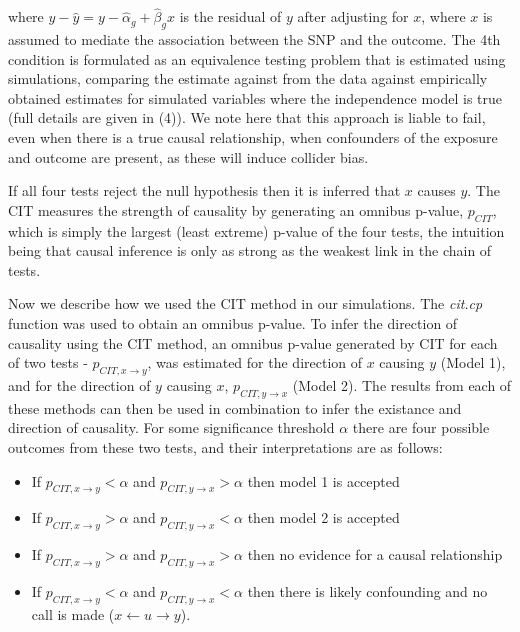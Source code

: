 \documentclass[]{article}
\providecommand{\tightlist}{%
  \setlength{\itemsep}{0pt}\setlength{\parskip}{0pt}}
\begin{document}
where \(y - \hat{y} = y - \hat{\alpha}_g + \hat{\beta}_g x\) is the
residual of \(y\) after adjusting for \(x\), where \(x\) is assumed to
mediate the association between the SNP and the outcome. The 4th
condition is formulated as an equivalence testing problem that is
estimated using simulations, comparing the estimate against from the
data against empirically obtained estimates for simulated variables
where the independence model is true (full details are given in (4)). We
note here that this approach is liable to fail, even when there is a
true causal relationship, when confounders of the exposure and outcome
are present, as these will induce collider bias.

If all four tests reject the null hypothesis then it is inferred that
\(x\) causes \(y\). The CIT measures the strength of causality by
generating an omnibus p-value, \(p_{CIT}\), which is simply the largest
(least extreme) p-value of the four tests, the intuition being that
causal inference is only as strong as the weakest link in the chain of
tests.

Now we describe how we used the CIT method in our simulations. The
\emph{cit.cp} function was used to obtain an omnibus p-value. To infer
the direction of causality using the CIT method, an omnibus p-value
generated by CIT for each of two tests - \(p_{CIT, x \rightarrow y}\),
was estimated for the direction of \(x\) causing \(y\) (Model 1), and
for the direction of \(y\) causing \(x\), \(p_{CIT, y \rightarrow x}\)
(Model 2). The results from each of these methods can then be used in
combination to infer the existance and direction of causality. For some
significance threshold \(\alpha\) there are four possible outcomes from
these two tests, and their interpretations are as follows:

\begin{itemize}
\tightlist
\item
  If \(p_{CIT, x \rightarrow y} < \alpha\) and
  \(p_{CIT, y \rightarrow x} > \alpha\) then model 1 is accepted
\item
  If \(p_{CIT, x \rightarrow y} > \alpha\) and
  \(p_{CIT, y \rightarrow x} < \alpha\) then model 2 is accepted
\item
  If \(p_{CIT, x \rightarrow y} > \alpha\) and
  \(p_{CIT, y \rightarrow x} > \alpha\) then no evidence for a causal
  relationship
\item
  If \(p_{CIT, x \rightarrow y} < \alpha\) and
  \(p_{CIT, y \rightarrow x} < \alpha\) then there is likely confounding
  and no call is made (\(x \leftarrow u \rightarrow y\)).
\end{itemize}
\end{document}
